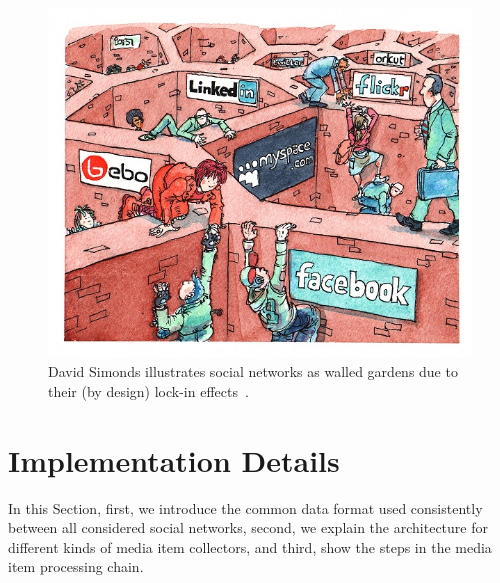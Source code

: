 \documentclass{acm_proc_article-sp}
\begin{document}
\begin{figure}
\centering
\includegraphics[width=1.0\linewidth,trim=16px 17px 12px 15px,clip]{./resources/davidsimonds.jpg}
\caption{David Simonds illustrates social networks as walled gardens due to their (by design) lock-in effects~\cite{DavidSimonds}.}
\label{fig:DavidSimonds}
\end{figure}

\section{Implementation Details}
In this Section, first, we introduce the common data format used consistently between all considered social networks,
second, we explain the architecture for different kinds of media item collectors,
and third, show the steps in the media item processing chain.
\end{document}
